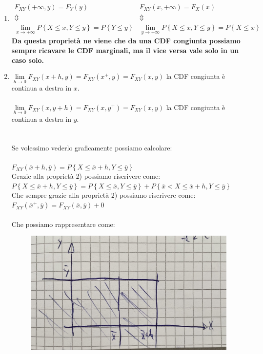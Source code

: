 \documentclass{article}
\begin{document}
\begin{enumerate}
    \item $\begin{matrix}
    F_{XY}(+\infty, y) = F_Y(y) & F_{XY}(x, +\infty) = F_X(x) \\
    \Updownarrow & \Updownarrow \\
    \underset{x \to +\infty}{\lim} P\left\{ X \leq x, Y \leq y \right\} = P \left\{ Y \leq y\right\} & 
    \underset{y \to +\infty}{\lim} P\left\{ X \leq x, Y \leq y \right\} = P \left\{ X \leq x\right\}
    \end{matrix}$ \\
    \textbf{Da questa proprietà ne viene che da una CDF congiunta possiamo sempre ricavare le CDF marginali, ma il vice versa vale solo in un caso solo.}
    \item $\underset{h \to 0}{\lim} F_{XY}(x+h,y) = F_{XY}(x^+,y) = F_{XY}(x,y)$ la CDF congiunta è continua a destra in $x$. \\ \\
    $\underset{h \to 0}{\lim} F_{XY}(x,y+h) = F_{XY}(x,y^+) = F_{XY}(x,y)$ la CDF congiunta è continua a destra in $y$. \\ \\ \\
    Se volessimo vederlo graficamente possiamo calcolare: \\ \\
    $F_{XY}(\overline x +h , \overline y) = P \left\{X \leq \overline x +h, Y \leq \overline y\right\}$ \\
    Grazie alla proprietà 2) possiamo riscrivere come: \\
    $P \left\{X \leq \overline x + h, Y \leq \overline y \right\} = P \left\{X \leq \overline x, Y \leq \overline y \right\} + P\left\{ \overline x < X \leq \overline x + h, Y \leq \overline y\right\}$ \\
    Che sempre grazie alla proprietà 2) possiamo riscrivere come: \\
    $F_{XY} (\overline x ^+, \overline y ) = F_{XY}(\overline x, \overline y) + 0$ \\ \\
    Che possiamo rappresentare come: 
    \begin{figure}[H]
    \centering
    \includegraphics[scale=0.20]{images/72.Prop6CDFVettA.jpeg}

\end{figure}
\end{enumerate}
\end{document}
